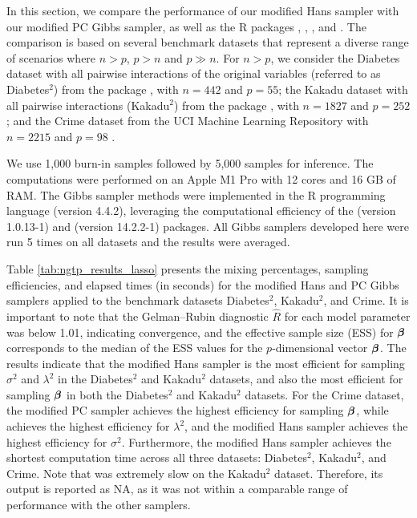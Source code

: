 In this section, we compare the performance of our modified Hans sampler with our modified PC Gibbs sampler, as well as the R packages , , , and  \citep{monomvn,bayeslm,Stan_Development_Team2020-sz,makalic2016high}. The comparison is based on several benchmark datasets that represent a diverse range of scenarios where $n>p$,  $p>n$ and $p \gg n$. For $n>p$, we consider the Diabetes dataset with all pairwise interactions of the original variables (referred to as Diabetes${}^2$) from the  package \citep{efron2004least, lars}, with $n = 442$ and $p = 55$;  the Kakadu dataset with all pairwise interactions (Kakadu${}^2$) from the  package \citep{Ecdat}, with $n = 1827$ and $p = 252$; and the Crime dataset from the UCI Machine Learning Repository with $n = 2215$ and $p = 98$ \citep{communities_and_crime_183}. 

 
We use 1,000 burn-in samples followed by 5,000 samples for inference. The computations were performed on an Apple M1 Pro with 12 cores and 16 GB of RAM. The Gibbs sampler methods were implemented in the R programming language (version 4.4.2), leveraging the computational efficiency of the  (version 1.0.13-1) \citep{Eddelbuettel1,Eddelbuettel2,Eddelbuettel3,Eddelbuettel4} and  (version 14.2.2-1) \citep{Eddelbuettel5,Eddelbuettel6} packages. All Gibbs samplers developed here were run 5 times on all datasets and the results were averaged.




Table \ref{tab:ngtp_results_lasso} presents the mixing percentages, sampling efficiencies, and elapsed times (in seconds) for the modified Hans and PC Gibbs samplers applied to the benchmark datasets Diabetes${}^2$, Kakadu${}^2$, and Crime. It is important to note that the Gelman–Rubin diagnostic $\widehat{R}$ for each model parameter was below 1.01, indicating convergence, and the effective sample size (ESS) for ${\boldsymbol \beta}$ corresponds to the median of the ESS values for the $p$-dimensional vector ${\boldsymbol \beta}$. The results indicate that the modified Hans sampler is the most efficient for sampling 
$\sigma^2$ and $\lambda^2$ in the Diabetes$^2$ and Kakadu$^2$ datasets, and also the 
most efficient for sampling ${\boldsymbol \beta}$ in both the Diabetes$^2$ and Kakadu$^2$ datasets. 
For the Crime dataset, the modified PC sampler achieves the highest efficiency for 
sampling ${\boldsymbol \beta}$, while  achieves the highest efficiency for 
$\lambda^2$, and the modified Hans sampler achieves the highest efficiency for 
$\sigma^2$. Furthermore, the modified Hans sampler achieves the shortest computation 
time across all three datasets: Diabetes$^2$, Kakadu${}^2$, and Crime. Note that 
 was extremely slow on the Kakadu$^2$ dataset. Therefore, its output 
is reported as NA, as it was not within a comparable range of performance with the 
other samplers.



